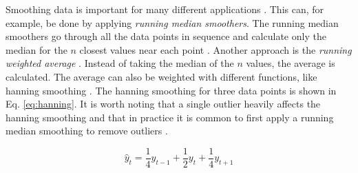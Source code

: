 Smoothing data is important for many different applications \cite{Bradley1997, Pang2002, Quinlan1992, Velleman1981}.
This can, for example, be done by applying \emph{running median smoothers}.
The running median smoothers go through all the data points in sequence and calculate only the median for the $n$ closest values near each point \cite{Velleman1981}.
Another approach is the \emph{running weighted average} \cite{Velleman1981}.
Instead of taking the median of the $n$ values, the average is calculated.
The average can also be weighted with different functions, like hanning smoothing \cite{Velleman1981}.
The hanning smoothing for three data points is shown in Eq. \ref{eq:hanning}.
It is worth noting that a single outlier heavily affects the hanning smoothing and that in practice it is common to first apply a running median smoothing to remove outliers \cite{Velleman1981}.

\begin{equation}
    \hat y_t = \frac{1}{4} y_{t-1} + \frac{1}{2} y_t + \frac{1}{4} y_{t + 1} 
    \label{eq:hanning}
\end{equation}